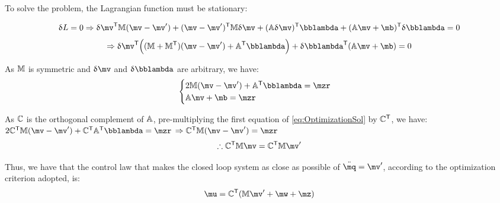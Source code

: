 To solve the problem, the Lagrangian function must be stationary:

$$ \dl L = 0 \Rightarrow \dl \mv^\msT \mM (\mv - \mv') + (\mv - \mv')^\msT \mM \dl \mv + (\mA \dl \mv)^\msT \mlambda + (\mA \mv + \mb)^\msT \dl \mlambda = 0 $$
$$ \Rightarrow \dl \mv^\msT \Big( (\mM + \mM^\msT)(\mv - \mv') + \mA^\msT \mlambda \Big) + \dl \mlambda^\msT (\mA \mv + \mb) = 0 $$

As $\mathbb{M}$ is symmetric and $\dl \mv$ and $\dl \mlambda$ are arbitrary, we have:
\begin{equation} \label{eq:OptimizationSol}
\begin{cases}
2 \mM (\mv - \mv') + \mA^\msT \mlambda = \mzr \\
\mA \mv + \mb = \mzr
\end{cases}
\end{equation}

As $\mathbb{C}$ is the orthogonal complement of $\mathbb{A}$, pre-multiplying the first equation of \eqref{eq:OptimizationSol} by $\mathbb{C}^{\mathsf{T}}$, we have: \\

$ 2 \mC^\msT \mM (\mv - \mv') + \mC^\msT \mA^\msT \mlambda = \mzr $
$ \Rightarrow  \mC^\msT \mM (\mv - \mv')  = \mzr $
\begin{equation} \label{eq:OptimizationSol2}
\therefore \mC^\msT \mM \mv  = \mC^\msT \mM  \mv'
\end{equation}

Thus, we have that the control law that makes the closed loop system as close as possible of $\ddot{\mq} = \mv'$, 
according to the optimization criterion adopted, is:
\begin{equation} \label{eq:ControlLawFinal}
\mu = \mC^\msT ( \mM \mv' + \mw + \mz )
\end{equation}